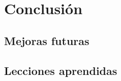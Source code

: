
\chapter{Conclusión}\label{conclusion}
\section{Mejoras futuras}\label{sec:mejoras_futuras}

\section{Lecciones aprendidas}\label{sec:lecciones_aprendidas}